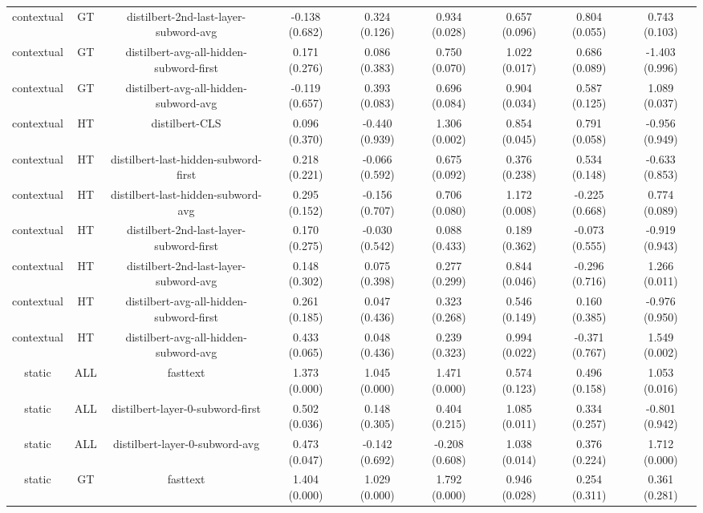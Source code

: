\begin{sidewaystable}[htb]
\begin{tabular}{@{}ccccccccc@{}}
        contextual & GT & distilbert-2nd-last-layer-subword-avg & -0.138 (0.682) & 0.324 (0.126) & 0.934 (0.028) & 0.657 (0.096) & 0.804 (0.055) & 0.743 (0.103) \\
        contextual & GT & distilbert-avg-all-hidden-subword-first & 0.171 (0.276) & 0.086 (0.383) & 0.750 (0.070) & 1.022 (0.017) & 0.686 (0.089) & -1.403 (0.996) \\
        contextual & GT & distilbert-avg-all-hidden-subword-avg & -0.119 (0.657) & 0.393 (0.083) & 0.696 (0.084) & 0.904 (0.034) & 0.587 (0.125) & 1.089 (0.037) \\
        contextual & HT & distilbert-CLS & 0.096 (0.370) & -0.440 (0.939) & 1.306 (0.002) & 0.854 (0.045) & 0.791 (0.058) & -0.956 (0.949) \\
        contextual & HT & distilbert-last-hidden-subword-first & 0.218 (0.221) & -0.066 (0.592) & 0.675 (0.092) & 0.376 (0.238) & 0.534 (0.148) & -0.633 (0.853) \\
        contextual & HT & distilbert-last-hidden-subword-avg & 0.295 (0.152) & -0.156 (0.707) & 0.706 (0.080) & 1.172 (0.008) & -0.225 (0.668) & 0.774 (0.089) \\
        contextual & HT & distilbert-2nd-last-layer-subword-first & 0.170 (0.275) & -0.030 (0.542) & 0.088 (0.433) & 0.189 (0.362) & -0.073 (0.555) & -0.919 (0.943) \\
        contextual & HT & distilbert-2nd-last-layer-subword-avg & 0.148 (0.302) & 0.075 (0.398) & 0.277 (0.299) & 0.844 (0.046) & -0.296 (0.716) & 1.266 (0.011) \\
        contextual & HT & distilbert-avg-all-hidden-subword-first & 0.261 (0.185) & 0.047 (0.436) & 0.323 (0.268) & 0.546 (0.149) & 0.160 (0.385) & -0.976 (0.950) \\
        contextual & HT & distilbert-avg-all-hidden-subword-avg & 0.433 (0.065) & 0.048 (0.436) & 0.239 (0.323) & 0.994 (0.022) & -0.371 (0.767) & 1.549 (0.002) \\
        static & ALL & fasttext & 1.373 (0.000) & 1.045 (0.000) & 1.471 (0.000) & 0.574 (0.123) & 0.496 (0.158) & 1.053 (0.016) \\
        static & ALL & distilbert-layer-0-subword-first & 0.502 (0.036) & 0.148 (0.305) & 0.404 (0.215) & 1.085 (0.011) & 0.334 (0.257) & -0.801 (0.942) \\
        static & ALL & distilbert-layer-0-subword-avg & 0.473 (0.047) & -0.142 (0.692) & -0.208 (0.608) & 1.038 (0.014) & 0.376 (0.224) & 1.712 (0.000) \\
        static & GT & fasttext & 1.404 (0.000) & 1.029 (0.000) & 1.792 (0.000) & 0.946 (0.028) & 0.254 (0.311) & 0.361 (0.281) \\

\end{tabular}
\end{sidewaystable}
